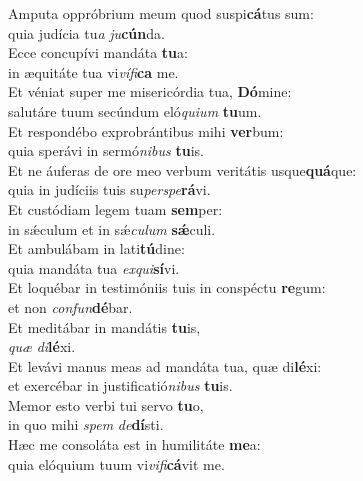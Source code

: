 \oddverse Amputa oppróbrium meum quod suspi\textbf{cá}tus sum:~\*\\
\oddverse quia judícia tu\textit{a} \textit{ju}\textbf{cún}da.\\
\evenverse Ecce concupívi mandáta \textbf{tu}a:~\*\\
\evenverse in æquitáte tua vi\textit{ví}\textit{fi}\textbf{ca} me.\\
\oddverse Et véniat super me misericórdia tua, \textbf{Dó}mine:~\*\\
\oddverse salutáre tuum secúndum eló\textit{qui}\textit{um} \textbf{tu}um.\\
\evenverse Et respondébo exprobrántibus mihi \textbf{ver}bum:~\*\\
\evenverse quia sperávi in sermó\textit{ni}\textit{bus} \textbf{tu}is.\\
\oddverse Et ne áuferas de ore meo verbum veritátis usque\textbf{quá}que:~\*\\
\oddverse quia in judíciis tuis su\textit{per}\textit{spe}\textbf{rá}vi.\\
\evenverse Et custódiam legem tuam \textbf{sem}per:~\*\\
\evenverse in sǽculum et in sǽ\textit{cu}\textit{lum} \textbf{sǽ}culi.\\
\oddverse Et ambulábam in lati\textbf{tú}dine:~\*\\
\oddverse quia mandáta tua \textit{ex}\textit{qui}\textbf{sí}vi.\\
\evenverse Et loquébar in testimóniis tuis in conspéctu \textbf{re}gum:~\*\\
\evenverse et non \textit{con}\textit{fun}\textbf{dé}bar.\\
\oddverse Et meditábar in mandátis \textbf{tu}is,~\*\\
\oddverse \textit{quæ} \textit{di}\textbf{lé}xi.\\
\evenverse Et levávi manus meas ad mandáta tua, quæ di\textbf{lé}xi:~\*\\
\evenverse et exercébar in justificatió\textit{ni}\textit{bus} \textbf{tu}is.\\
\oddverse Memor esto verbi tui servo \textbf{tu}o,~\*\\
\oddverse in quo mihi \textit{spem} \textit{de}\textbf{dí}sti.\\
\evenverse Hæc me consoláta est in humilitáte \textbf{me}a:~\*\\
\evenverse quia elóquium tuum vi\textit{vi}\textit{fi}\textbf{cá}vit me.\\
